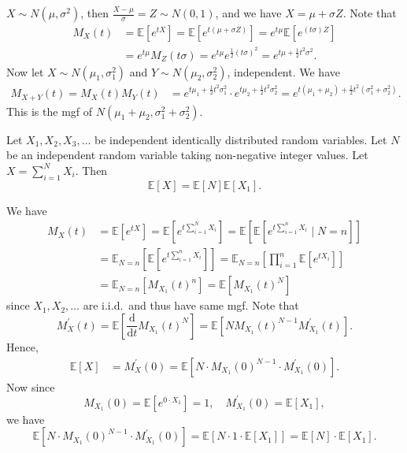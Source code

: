 \begin{eg}
    \(X \sim N(\mu , \sigma ^2) \), then \(\frac{X - \mu }{\sigma } = Z \sim N(0, 1)\), and we have \(X = \mu + \sigma Z\). Note that 
    \begin{align*}
        M_X(t) &= \mathbb{E} \left[ e^{tX} \right] = \mathbb{E} \left[ e^{t(\mu + \sigma Z)} \right] = e^{t \mu } \mathbb{E} \left[ e^{(t \sigma) Z} \right] \\
        &= e^{t \mu } M_Z(t \sigma ) = e^{t \mu } e^{\frac{1}{2} (t \sigma )^2} = e^{t \mu + \frac{1}{2} t^2 \sigma ^2}.   
    \end{align*}   
    Now let \(X \sim N(\mu _1, \sigma_1 ^2)\) and \(Y \sim N(\mu _2, \sigma _2^2)\), independent. We have 
    \begin{align*}
        M_{X + Y}(t) = M_X(t) M_Y(t) &= e^{t \mu _1 + \frac{1}{2} t^2 \sigma _1^2} \cdot e^{t \mu _2 + \frac{1}{2} t^2 \sigma _2^2} = e^{t(\mu _1 + \mu _2) + \frac{1}{2} t^2 (\sigma _1^2 + \sigma _2^2)} .
    \end{align*} 
    This is the mgf of \(N(\mu _1 + \mu _2, \sigma _1^2 + \sigma _2^2)\). 
\end{eg}

\begin{eg}
    Let \(X_1, X_2, X_3, \dots \) be independent identically distributed random variables. Let \(N\) be an independent random variable taking non-negative integer values. Let \(X = \sum_{i=1}^N X_i \). Then 
    \[
        \mathbb{E} [X] = \mathbb{E} [N] \mathbb{E} [X_1].
    \]   
\end{eg}
\begin{explanation}
    We have 
    \begin{align*}
        M_X(t) &= \mathbb{E} [e^{tX}] = \mathbb{E} \left[ e^{t \sum_{i=1}^N X_i } \right] = \mathbb{E} \left[ \mathbb{E} \left[ e^{t \sum_{i=1}^n X_i } \mid N = n \right]  \right] \\
        &= \mathbb{E} _{N = n} \left[ \mathbb{E} \left[ e^{t \sum_{i=1}^n X_i } \right]  \right] = \mathbb{E}_{N = n} \left[ \prod _{i=1}^n \mathbb{E} [e^{tX_i}] \right] \\
        &= \mathbb{E} _{N = n} \left[ M_{X_1}(t)^n \right] = \mathbb{E} \left[ M_{X_1}(t)^N \right]      
    \end{align*}
    since \(X_1, X_2, \dots \) are i.i.d.\ and thus have same mgf. 
    Note that 
    \[
        M_X^{\prime} (t) = \mathbb{E} \left[ \frac{\mathrm{d}}{\mathrm{d}t} M_{X_1}(t)^N  \right] = \mathbb{E} \left[ N M_{X_1} (t)^{N - 1} M_{X_1}^{\prime} (t) \right]. 
    \]
    Hence,
    \begin{align*}
        \mathbb{E} [X] &= M_X^{\prime} (0) = \mathbb{E} \left[ N \cdot M_{X_1}(0)^{N - 1} \cdot M_{X_1}^{\prime} (0) \right].
    \end{align*}
    Now since 
    \[
        M_{X_1}(0) = \mathbb{E} [e^{0 \cdot X_1}] = 1, \quad M_{X_1}^{\prime} (0) = \mathbb{E} [X_1],
    \]
    we have 
    \[
       \mathbb{E} \left[ N \cdot M_{X_1}(0)^{N - 1} \cdot M_{X_1}^{\prime} (0) \right] = \mathbb{E} [N \cdot 1 \cdot \mathbb{E} [X_1]] = \mathbb{E} [N] \cdot \mathbb{E} [X_1]. 
    \]
\end{explanation}

